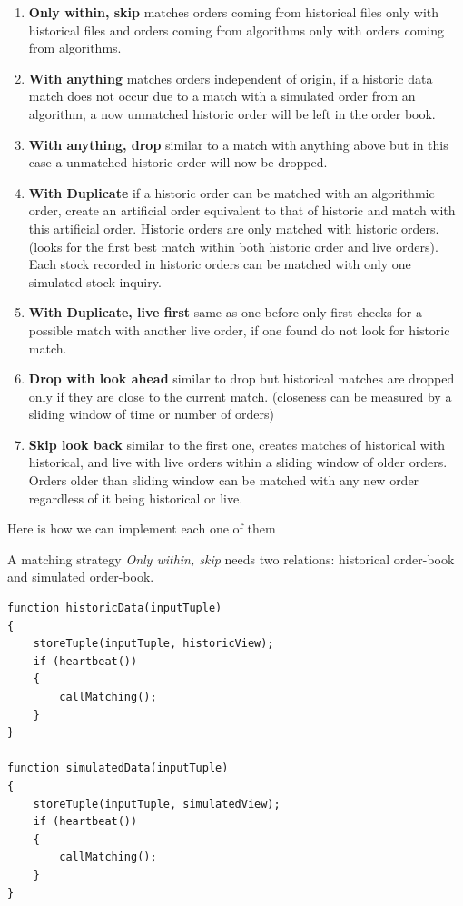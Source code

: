 \documentclass{article}
\begin{document}
\begin{enumerate}
    \item {\bf Only within, skip} matches orders coming from historical files only with historical files and orders coming from algorithms only with orders coming from algorithms.
    \item{\bf With anything} matches orders independent of origin, if a historic data match does not occur due to a match with a simulated order from an algorithm, a now unmatched historic order will be left in the order book. 
    \item{\bf With anything, drop} similar to a match with anything above but in this case a unmatched historic order will now be dropped.
    \item{\bf With Duplicate} if a historic order can be matched with an algorithmic order, create an artificial order equivalent to that of historic and match with this artificial order. Historic orders are only matched with historic orders. (looks for the first best match within both historic order and live orders). Each stock recorded in historic orders can be matched with only one simulated stock inquiry.  
    \item{\bf With Duplicate, live first} same as one before only first checks for a possible match with another live order, if one found do not look for historic match. 
    \item{\bf Drop with look ahead} similar to drop but historical matches are dropped only if they are close to the current match. (closeness can be measured by a sliding window of time or number of orders)
    \item{\bf Skip look back} similar to the first one, creates matches of historical with historical, and live with live orders within a sliding window of older orders. Orders older than sliding window can be matched with any new order regardless of it being historical or live.
\end{enumerate}

\noindent Here is how we can implement each one of them

A matching strategy \emph{Only within, skip} needs two relations: historical order-book and simulated order-book.

\begin{verbatim}   
function historicData(inputTuple)
{
    storeTuple(inputTuple, historicView);
    if (heartbeat())
    {
        callMatching();
    }
}

function simulatedData(inputTuple)
{
    storeTuple(inputTuple, simulatedView);
    if (heartbeat())
    {
        callMatching();
    }
}
\end{verbatim}
\end{document}

